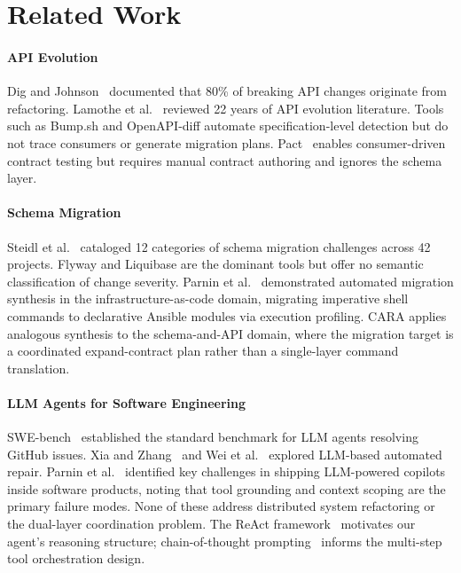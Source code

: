 \documentclass[10pt,twocolumn]{article}
\begin{document}
\section{Related Work}

\paragraph{API Evolution} Dig and Johnson~\cite{dig2006api} documented that 80\%
of breaking API changes originate from refactoring. Lamothe et al.~\cite{lamothe2021api}
reviewed 22 years of API evolution literature. Tools such as Bump.sh and
OpenAPI-diff automate specification-level detection but do not trace consumers
or generate migration plans. Pact~\cite{cito2021empirical} enables consumer-driven
contract testing but requires manual contract authoring and ignores the schema layer.

\paragraph{Schema Migration} Steidl et al.~\cite{steidl2023migration} cataloged
12 categories of schema migration challenges across 42 projects. Flyway and
Liquibase are the dominant tools but offer no semantic classification of change
severity. Parnin et al.~\cite{parnin2022dozer} demonstrated automated migration
synthesis in the infrastructure-as-code domain, migrating imperative shell
commands to declarative Ansible modules via execution profiling. CARA applies
analogous synthesis to the schema-and-API domain, where the migration target
is a coordinated expand-contract plan rather than a single-layer command translation.

\paragraph{LLM Agents for Software Engineering} SWE-bench~\cite{jimenez2024swebench}
established the standard benchmark for LLM agents resolving GitHub issues.
Xia and Zhang~\cite{xia2023automated} and Wei et al.~\cite{wei2023llm4se} explored
LLM-based automated repair. Parnin et al.~\cite{parnin2025copilot} identified
key challenges in shipping LLM-powered copilots inside software products,
noting that tool grounding and context scoping are the primary failure modes.
None of these address distributed system refactoring or the dual-layer
coordination problem. The ReAct framework~\cite{yao2023react} motivates our
agent's reasoning structure; chain-of-thought prompting~\cite{wei2022chainofthought}
informs the multi-step tool orchestration design.
\end{document}

